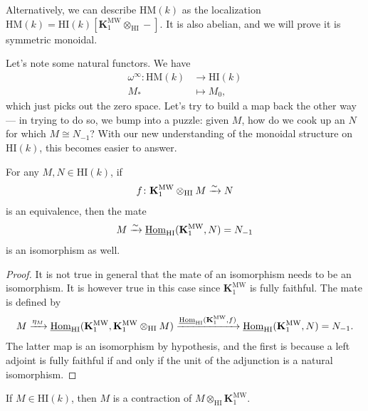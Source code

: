 \documentclass[11pt,openany]{book}
\providecommand{\HI}{\mathrm{HI}}
\providecommand{\HM}{\mathrm{HM}}
\providecommand{\KMW}{\mathbf{K}^\mathrm{MW}}
\begin{document}
\begin{remark} Alternatively, we can describe $\HM(k)$ as the localization $\HM(k) = \HI(k) \left[ \KMW_1 \otimes_\HI - \right]$. It is also abelian, and we will prove it is symmetric monoidal.
\end{remark}

Let's note some natural functors. We have 
\begin{align*}
    \omega^\infty \colon \HM(k) &\to \HI(k) \\
    M_\ast &\mapsto M_0,
\end{align*}
which just picks out the zero space. Let's try to build a map back the other way --- in trying to do so, we bump into a puzzle: given $M$, how do we cook up an $N$ for which $M \cong N_{-1}$? With our new understanding of the monoidal structure on $\HI(k)$, this becomes easier to answer.


\begin{corollary} For any $M,N \in \HI(k)$, if
\begin{align*}
    f\colon \KMW_1 \otimes_\HI M \xto{\sim} N
\end{align*}
is an equivalence, then the mate
\begin{align*}
    M \xto{\sim} \underline{\Hom}_\HI(\KMW_1,N) = N_{-1}
\end{align*}
is an isomorphism as well.
\end{corollary}
\begin{proof} It is not true in general that the mate of an isomorphism needs to be an isomorphism. It is however true in this case since $\KMW_1$ is fully faithful. The mate is defined by
\begin{align*}
    M \xto{\eta_M} \underline{\Hom}_\HI(\KMW_1, \KMW_1 \otimes_\HI M) \xto{\underline{\Hom}_\HI(\KMW_1,f)} \underline{\Hom}_\HI(\KMW_1,N) = N_{-1}.
\end{align*}
The latter map is an isomorphism by hypothesis, and the first is because a left adjoint is fully faithful if and only if the unit of the adjunction is a natural isomorphism.
\end{proof}



\begin{corollary} If $M \in \HI(k)$, then $M$ is a contraction of $M \otimes_\HI \KMW_1$.
\end{corollary}
\end{document}
